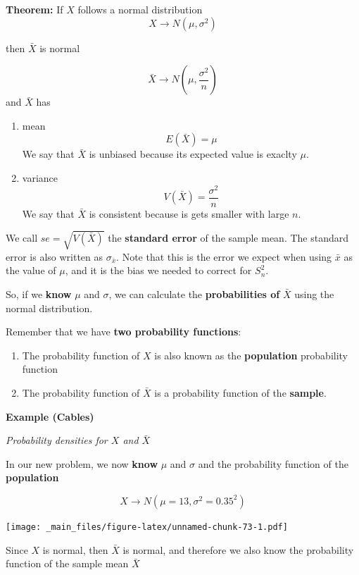 \documentclass[
]{book}
\begin{document}
\textbf{Theorem:} If \(X\) follows a normal distribution \[X \rightarrow N(\mu, \sigma^2)\]

then \(\bar{X}\) is normal

\[\bar{X} \rightarrow N(\mu, \frac{\sigma^2}{n})\]
and \(\bar{X}\) has

\begin{enumerate}
\def\labelenumi{\arabic{enumi})}
\item
  mean
  \[E(\bar{X})=\mu\]
  We say that \(\bar{X}\) is unbiased because its expected value is exaclty \(\mu\).
\item
  variance
  \[V(\bar{X})=\frac{\sigma^2}{n}\]
  We say that \(\bar{X}\) is consistent because is gets smaller with large \(n\).
\end{enumerate}

We call \(se=\sqrt{V(\bar{X})}\) the \textbf{standard error} of the sample mean. The standard error is also written as \(\sigma_{\bar{x}}\). Note that this is the error we expect when using \(\bar{x}\) as the value of \(\mu\), and it is the bias we needed to correct for \(S_n^2\).

So, if we \textbf{know} \(\mu\) and \(\sigma\), we can calculate the \textbf{probabilities of} \(\bar{X}\) using the normal distribution.

Remember that we have \textbf{two probability functions}:

\begin{enumerate}
\def\labelenumi{\arabic{enumi}.}
\item
  The probability function of \(X\) is also known as the \textbf{population} probability function
\item
  The probability function of \(\bar{X}\) is a probability function of the \textbf{sample}.
\end{enumerate}

\textbf{Example (Cables)}

\emph{Probability densities for \(X\) and \(\bar{X}\)}

In our new problem, we now \textbf{know} \(\mu\) and \(\sigma\) and the probability function of the \textbf{population}

\[X \rightarrow N(\mu=13, \sigma^2=0.35^2)\]

\texttt{[image: \_main\_files/figure-latex/unnamed-chunk-73-1.pdf]}

Since \(X\) is normal, then \(\bar{X}\) is normal, and therefore we also know the probability function of the sample mean \(\bar{X}\)
\end{document}
